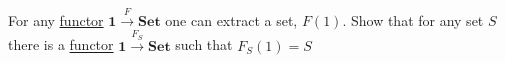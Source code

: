 For any \href{doc/1 math/Seven Sketches in Compositionality/Chapter 3: Databases/3 Functors, natural transformations, and databases/2 Functors/1 Functor}{functor} $\mathbf{1} \xrightarrow{F} \mathbf{Set}$ one can extract a set, $F(1)$. Show that for any set $S$ there is a \href{doc/1 math/Seven Sketches in Compositionality/Chapter 3: Databases/3 Functors, natural transformations, and databases/2 Functors/1 Functor}{functor} $\mathbf{1}\xrightarrow{F_S}\mathbf{Set}$ such that $F_S(1)=S$